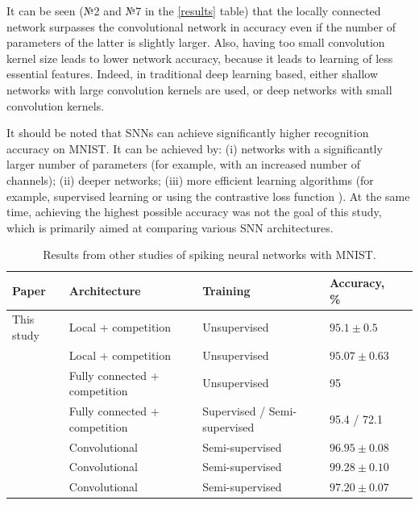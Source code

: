\documentclass[a4paper,10pt]{article}
\begin{document}

It can be seen (№2 and №7 in the \ref{results} table) that the locally connected network surpasses the convolutional network in accuracy even if the number of parameters of the latter is slightly larger. Also, having too small convolution kernel size leads to lower network accuracy, because it leads to learning of less essential features. Indeed, in traditional deep learning based, either shallow networks with large convolution kernels are used, or deep networks with small convolution kernels.

It should be noted that SNNs can achieve significantly higher recognition accuracy on MNIST. It can be achieved by: (i) networks with a significantly larger number of parameters (for example, with an increased number of channels); (ii) deeper networks; (iii) more efficient learning algorithms (for example, supervised learning or using the contrastive loss function \cite{contrastive_loss}). At the same time, achieving the highest possible accuracy was not the goal of this study, which is primarily aimed at comparing various SNN architectures.

\begin{table}
 \caption{Results from other studies of spiking neural networks with MNIST.}
\begin{center}
\begin{tabular}{|l|p{4cm}|p{7cm}|l|l|}
\hline
Paper & Architecture & Training & Accuracy, \% \\
\hline\hline
{This study} & {Local + competition} & {Unsupervised} & {$95.1 \pm 0.5$}\\
\hline\hline
{\cite{saunders2019locally}} & {Local + competition} & {Unsupervised} & {$95.07 \pm 0.63$}\\
\hline
{\cite{mnist2}} & {Fully connected + competition} & {Unsupervised} & {95}\\
\hline
{\cite{MaxActiv1}} & {Fully connected + competition} & {Supervised / Semi-supervised} & {95.4 / 72.1}\\
\hline
{\cite{conv1}} & {Convolutional} & {Semi-supervised} & {$96.95 \pm 0.08$}\\
\hline
{\cite{conv2}} & {Convolutional} & {Semi-supervised} & {$99.28 \pm 0.10$}\\
\hline
{\cite{conv3}} & {Convolutional} & {Semi-supervised} & {$97.20 \pm 0.07$}\\
\hline
\end{tabular}
\end{center}
\end{table}
\end{document}
